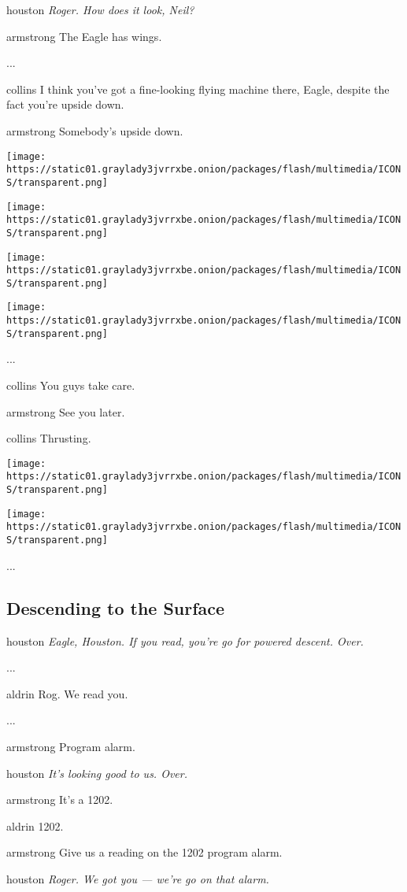 houston \emph{Roger. How does it look, Neil?}

armstrong The Eagle has wings.

...

collins I think you've got a fine-looking flying machine there, Eagle,
despite the fact you're upside down.

armstrong Somebody's upside down.

\texttt{[image: https://static01.graylady3jvrrxbe.onion/packages/flash/multimedia/ICONS/transparent.png]}

\texttt{[image: https://static01.graylady3jvrrxbe.onion/packages/flash/multimedia/ICONS/transparent.png]}

\texttt{[image: https://static01.graylady3jvrrxbe.onion/packages/flash/multimedia/ICONS/transparent.png]}

\texttt{[image: https://static01.graylady3jvrrxbe.onion/packages/flash/multimedia/ICONS/transparent.png]}

...

collins You guys take care.

armstrong See you later.

collins Thrusting.

\texttt{[image: https://static01.graylady3jvrrxbe.onion/packages/flash/multimedia/ICONS/transparent.png]}

\texttt{[image: https://static01.graylady3jvrrxbe.onion/packages/flash/multimedia/ICONS/transparent.png]}

...

\hypertarget{-descending-to-the-surface-}{%
\subsection{ Descending to the Surface
}\label{-descending-to-the-surface-}}

houston \emph{Eagle, Houston. If you read, you're go for powered
descent. Over.}

...

aldrin Rog. We read you.

...

armstrong Program alarm.

houston \emph{It's looking good to us. Over.}

armstrong It's a 1202.

aldrin 1202.

armstrong Give us a reading on the 1202 program alarm.

houston \emph{Roger. We got you --- we're go on that alarm.}

